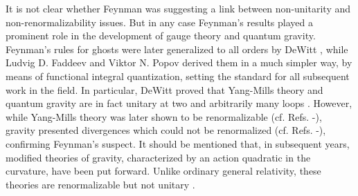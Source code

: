\documentclass{ws-procs961x669}            %
\begin{document}
It is not clear whether Feynman was suggesting a link between
non-unitarity and non-renormalizability issues. But in any case
Feynman's results played a prominent role in the development of
gauge theory and quantum gravity. Feynman's rules for ghosts were
later generalized to all orders by DeWitt \cite{DeWitt:1964yg,
DeWitt:1967ub, DeWitt:1967uc}, while Ludvig D. Faddeev and Viktor
N. Popov \cite{FaddeevPopov} derived them in a much simpler way,
by means of functional integral quantization, setting the standard
for all subsequent work in the field. In particular, DeWitt proved
that Yang-Mills theory and quantum gravity are in fact unitary at
two \cite{DeWitt:1964yg} and arbitrarily many loops
\cite{DeWitt:1967ub, DeWitt:1967uc}. However, while Yang-Mills
theory was later shown to be renormalizable (cf. Refs.
-), gravity
presented divergences which could not be renormalized (cf. Refs.
-), confirming
Feynman's suspect. It should be mentioned that, in subsequent
years, modified theories of gravity, characterized by an action
quadratic in the curvature, have been put forward. Unlike ordinary
general relativity, these theories are renormalizable but not
unitary \cite{Stelle:1976gc}.
\end{document}
